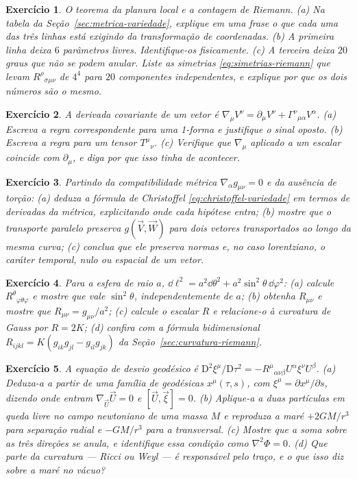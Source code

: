 \documentclass[12pt,a4paper,oneside]{book}
\theoremstyle{rgplain}
\newtheorem{exercise}{Exercício}[chapter]
\theoremstyle{rgremark}
\newcommand{\D}{\mathrm{D}}
\begin{document}
\begin{exercise}
O teorema da planura local e a contagem de Riemann.
(a) Na tabela da Seção~\ref{sec:metrica-variedade}, explique em uma frase o
que cada uma das três linhas está exigindo da transformação de coordenadas.
(b) A primeira linha deixa $6$ parâmetros livres. Identifique-os fisicamente.
(c) A terceira deixa $20$ graus que não se podem anular. Liste as simetrias
\eqref{eq:simetrias-riemann} que levam $R^\rho{}_{\sigma\mu\nu}$ de $4^4$ para
$20$ componentes independentes, e explique por que os dois números são o
mesmo.
\end{exercise}

\begin{exercise}
A derivada covariante de um vetor é
$\nabla_\mu V^\nu=\partial_\mu V^\nu+\Gamma^\nu{}_{\mu\alpha}V^\alpha$.
(a) Escreva a regra correspondente para uma 1-forma e justifique o sinal
oposto. (b) Escreva a regra para um tensor $T^{\mu}{}_{\nu}$. (c) Verifique
que $\nabla_\mu$ aplicado a um escalar coincide com $\partial_\mu$, e diga por
que isso \emph{tinha} de acontecer.
\end{exercise}

\begin{exercise}
Partindo da compatibilidade métrica $\nabla_\alpha g_{\mu\nu}=0$ e da ausência
de torção: (a) deduza a fórmula de Christoffel
\eqref{eq:christoffel-variedade} em termos de derivadas da métrica,
explicitando onde cada hipótese entra; (b) mostre que o transporte paralelo
preserva $g(\vec V,\vec W)$ para dois vetores transportados ao longo da mesma
curva; (c) conclua que ele preserva normas e, no caso lorentziano, o caráter
temporal, nulo ou espacial de um vetor.
\end{exercise}

\begin{exercise}
Para a esfera de raio $a$, $\dd\ell^2=a^2\dd\theta^2+a^2\sin^2\theta\,
\dd\varphi^2$: (a) calcule $R^\theta{}_{\varphi\theta\varphi}$ e mostre que
vale $\sin^2\theta$, independentemente de $a$; (b) obtenha $R_{\mu\nu}$ e
mostre que $R_{\mu\nu}=g_{\mu\nu}/a^2$; (c) calcule o escalar $R$ e relacione-o
à curvatura de Gauss por $R=2K$; (d) confira com a fórmula bidimensional
$R_{ijkl}=K(g_{ik}g_{jl}-g_{il}g_{jk})$ da Seção~\ref{sec:curvatura-riemann}.
\end{exercise}

\begin{exercise}
A equação de desvio geodésico é
$\D^2\xi^\mu/\D\tau^2=-R^\mu{}_{\alpha\nu\beta}U^\alpha\xi^\nu U^\beta$.
(a) Deduza-a a partir de uma família de geodésicas $x^\mu(\tau,s)$, com
$\xi^\mu=\partial x^\mu/\partial s$, dizendo onde entram $\nabla_{\vec U}\vec U=0$
e $[\vec U,\vec\xi]=0$. (b) Aplique-a a duas partículas em queda livre no
campo newtoniano de uma massa $M$ e reproduza a maré $+2GM/r^3$ para
separação radial e $-GM/r^3$ para a transversal. (c) Mostre que a soma sobre
as três direções se anula, e identifique essa condição como
$\nabla^2\Phi=0$. (d) Que parte da curvatura --- Ricci ou Weyl --- é
responsável pelo traço, e o que isso diz sobre a maré no vácuo?
\end{exercise}
\end{document}
